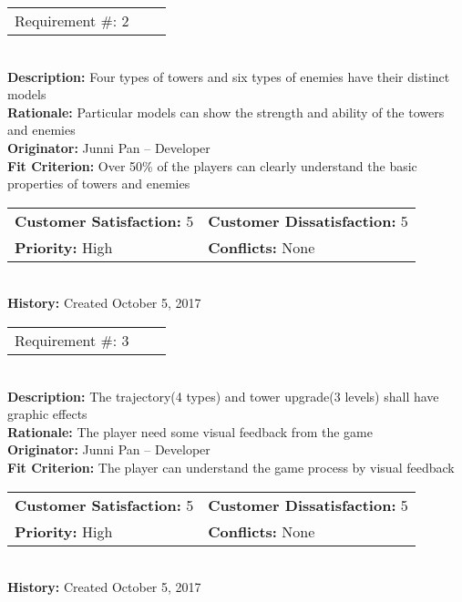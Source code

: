 \documentclass[12pt]{article}
\begin{document}
\begin{reqbox}
\begin{tabular}{ccc}Requirement \#: 2
\end{tabular} \\
\textbf{Description:} Four types of towers and six types of enemies have their distinct models\\
\textbf{Rationale:} Particular models can show the strength and ability of the towers and enemies\\
\textbf{Originator:} Junni Pan -- Developer \\
\textbf{Fit Criterion:} Over 50\% of the players can clearly understand the basic properties of towers and enemies\\
\begin{tabular}{ll}
\textbf{Customer Satisfaction:} 5 & \textbf{Customer Dissatisfaction:} 5 \\
\textbf{Priority:} High & \textbf{Conflicts:} None\\
\end{tabular} \\
\textbf{History:} Created October 5, 2017
\end{reqbox}


\begin{reqbox}
\begin{tabular}{ccc}Requirement \#: 3
\end{tabular} \\
\textbf{Description:} The trajectory(4 types) and tower upgrade(3 levels) shall have graphic effects\\
\textbf{Rationale:} The player need some visual feedback from the game\\
\textbf{Originator:} Junni Pan -- Developer \\
\textbf{Fit Criterion:} The player can understand the game process by visual feedback\\
\begin{tabular}{ll}
\textbf{Customer Satisfaction:} 5 & \textbf{Customer Dissatisfaction:} 5 \\
\textbf{Priority:} High & \textbf{Conflicts:} None\\
\end{tabular} \\
\textbf{History:} Created October 5, 2017
\end{reqbox}
\end{document}
